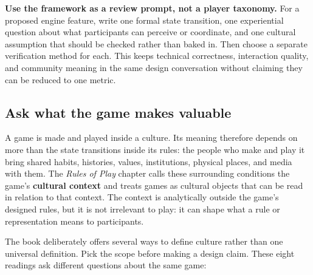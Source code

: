 \textbf{Use the framework as a review prompt, not a player taxonomy.} For a proposed engine feature, write one formal state transition, one experiential question about what participants can perceive or coordinate, and one cultural assumption that should be checked rather than baked in. Then choose a separate verification method for each. This keeps technical correctness, interaction quality, and community meaning in the same design conversation without claiming they can be reduced to one metric.

\subsection{Ask what the game makes valuable}\label{05-engine-i-ch009-ask-what-the-game-makes-valuable}

\hypertarget{05-engine-i-ch009-ask-what-the-game-makes-valuable}{}

A game is made and played inside a culture. Its meaning therefore depends on more than the state transitions inside its rules: the people who make and play it bring shared habits, histories, values, institutions, physical places, and media with them. The \emph{Rules of Play} chapter calls these surrounding conditions the game's \textbf{cultural context} and treats games as cultural objects that can be read in relation to that context. The context is analytically outside the game's designed rules, but it is not irrelevant to play: it can shape what a rule or representation means to participants.

The book deliberately offers several ways to define culture rather than one universal definition. Pick the scope before making a design claim. These eight readings ask different questions about the same game:

